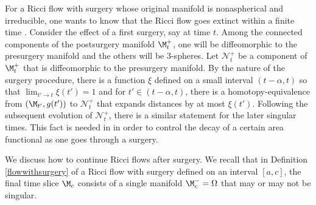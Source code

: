 \begin{remark}
  \label{rem:kl-performing-surgery-continuing-flows-existence-ricci-flow-surgery}

For a Ricci flow with surgery whose original manifold is nonaspherical and
irreducible,
one wants to know that the Ricci flow goes extinct within a finite time
\cite{Colding-Minicozzi,Colding-Minicozzi2,Perelman3}.
Consider the effect of a first surgery, say at time $t$. Among the connected
components of the postsurgery
manifold $\M_{t}^+$, one will
be diffeomorphic to the presurgery manifold
 and the others will be $3$-spheres.
Let ${\mathcal N}_{t}^+$ be a component  of $\M_{t}^+$ that is diffeomorphic to
the presurgery manifold.
By the nature of the surgery procedure, there is a
 function
$\xi$ defined on a small interval $(t-\alpha, t)$ so that
$\lim_{t' \rightarrow t} \xi(t') = 1$ and for $t' \in (t - \alpha, t)$,
there is a homotopy-equivalence from $(\M_{t'}, g(t'))$ to ${\mathcal N}_{t}^+$ that
expands distances by at most $\xi(t')$. Following the
subsequent evolution of
${\mathcal N}_{t}^+$,
there is a similar statement for
the later singular times. This fact is needed in
\cite{Colding-Minicozzi,Colding-Minicozzi2,Perelman3}
in order to control the decay of
a certain area functional as one goes through a surgery.
\end{remark}

We discuss how to continue Ricci flows after surgery.
We recall that in Definition \ref{flowwithsurgery}  of a Ricci flow with surgery defined
on an interval $[a,c]$, the final time slice $\M_c$ consists of a single
manifold $\M_c^- = \Omega$ that may or may not be singular.

